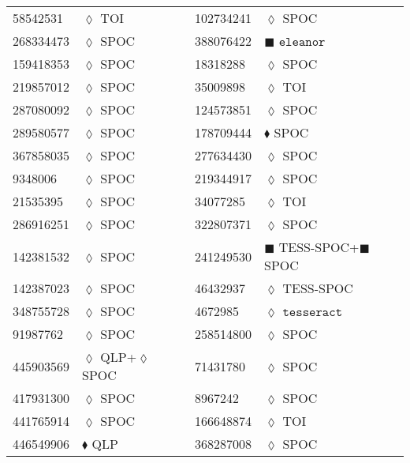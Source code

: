 \begin{longtable}{llrllr}
58542531 & $\lozenge$ TOI & \cite{TIC_154872375} & 102734241 & $\lozenge$ SPOC & \cite{TIC_219041246} \\
268334473 & $\lozenge$ SPOC & \cite{TIC_232540264} & 388076422 & $\blacksquare$ $\texttt{eleanor}$ & \cite{TIC_259172249} \\
159418353 & $\lozenge$ SPOC & \cite{TIC_159418353} & 18318288 & $\lozenge$ SPOC & \cite{TIC_18318288} \\
219857012 & $\lozenge$ SPOC & \cite{TIC_232540264} & 35009898 & $\lozenge$ TOI & \cite{TIC_154872375} \\
287080092 & $\lozenge$ SPOC & \cite{TIC_232540264} & 124573851 & $\lozenge$ SPOC & \cite{TIC_232540264} \\
289580577 & $\lozenge$ SPOC & \cite{TIC_232540264} & 178709444 & $\blacklozenge$ SPOC & \cite{TIC_178709444} \\
367858035 & $\lozenge$ SPOC & \cite{TIC_232540264} & 277634430 & $\lozenge$ SPOC & \cite{TIC_159418353} \\
9348006 & $\lozenge$ SPOC & \cite{TIC_232540264} & 219344917 & $\lozenge$ SPOC & \cite{TIC_159418353} \\
21535395 & $\lozenge$ SPOC & \cite{TIC_232540264} & 34077285 & $\lozenge$ TOI & \cite{TIC_154872375} \\
286916251 & $\lozenge$ SPOC & \cite{TIC_232540264} & 322807371 & $\lozenge$ SPOC & \cite{TIC_322807371} \\
142381532 & $\lozenge$ SPOC & \cite{TIC_232540264} & 241249530 & $\blacksquare$ TESS-SPOC+$\blacksquare$ SPOC & \cite{TIC_241249530} \\
142387023 & $\lozenge$ SPOC & \cite{TIC_232540264} & 46432937 & $\lozenge$ TESS-SPOC & \cite{TIC_178709444} \\
348755728 & $\lozenge$ SPOC & \cite{TIC_348755728} & 4672985 & $\lozenge$ $\texttt{tesseract}$ & \cite{TIC_4672985} \\
91987762 & $\lozenge$ SPOC & \cite{TIC_232540264} & 258514800 & $\lozenge$ SPOC & \cite{TIC_232540264} \\
445903569 & $\lozenge$ QLP+$\lozenge$ SPOC & \cite{TIC_445903569} & 71431780 & $\lozenge$ SPOC & \cite{TIC_232540264} \\
417931300 & $\lozenge$ SPOC & \cite{TIC_159418353} & 8967242 & $\lozenge$ SPOC & \cite{TIC_232540264} \\
441765914 & $\lozenge$ SPOC & \cite{TIC_232540264} & 166648874 & $\lozenge$ TOI & \cite{TIC_154872375} \\
446549906 & $\blacklozenge$ QLP & \cite{TIC_446549906} & 368287008 & $\lozenge$ SPOC & \cite{TIC_368287008} \\

\end{longtable}
